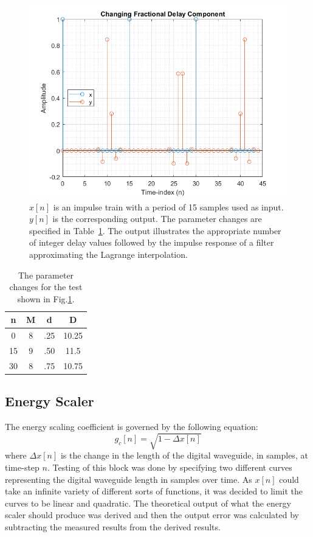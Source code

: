 \documentclass[../main.tex]{subfiles}
\begin{document}
\begin{figure}[h!]
    \centering
    \includegraphics[scale=.65]{./images/plots/LagrangeTest3.png}
    \caption{$x[n]$ is an impulse train with a period of 15 samples used as input. $y[n]$ is the corresponding output. The parameter changes are specified in Table~\ref{tab:LagrangeTest3}. The output illustrates the appropriate number of integer delay values followed by the impulse response of a filter approximating the Lagrange interpolation.}
    \label{fig:LagrangeTest3}
\end{figure}

\begin{table}[h!]
    \centering
     \begin{tabular}{||c| |c |c |c|} 
         \hline
         \textbf{n} & \textbf{M} & \textbf{d} & \textbf{D} \\ [0.5ex] 
         \hline
         0 & 8 & .25 & 10.25 \\ 
         \hline
         15 & 9 & .50 & 11.5 \\
         \hline
         30 & 8 & .75 & 10.75 \\
         \hline
    \end{tabular}
    \caption{The parameter changes for the test shown in Fig.\ref{fig:LagrangeTest3}.}
    \label{tab:LagrangeTest3}
\end{table}

\subsection{Energy Scaler}
The energy scaling coefficient is governed by the following equation:
\begin{equation}
\label{eq:g_c_n}
    g_c[n] = \sqrt{1-\Delta x[n]}
\end{equation}
where $\Delta x[n]$ is the change in the length of the digital waveguide, in samples, at time-step $n$. Testing of this block was done by specifying two different curves representing the digital waveguide length in samples over time. As $x[n]$ could take an infinite variety of different sorts of functions, it was decided to limit the curves to be linear and quadratic. The theoretical output of what the energy scaler should produce was derived and then the output error was calculated by subtracting the measured results from the derived results.
\end{document}
